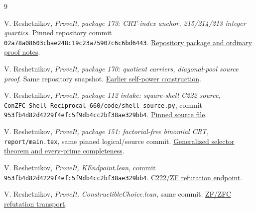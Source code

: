 \documentclass[11pt,a4paper]{article}
\theoremstyle{definition}
\newcommand{\file}[1]{\nolinkurl{#1}}
\begin{document}
\begin{thebibliography}{9}
\raggedright
{}
V. Reshetnikov, \emph{ProveIt, package 173: CRT-index anchor, 215/214/213
integer quartics}. Pinned repository commit
\texttt{02a78a08603cbae248c19c23a75907c6c6bd6443}.
\href{https://github.com/VladimirReshetnikov/ProveIt/tree/02a78a08603cbae248c19c23a75907c6c6bd6443/Computability/DiophantineConsistency/con-zfc-diophantine-forms/173-crt-index-anchor-215}{Repository package and ordinary proof notes}.

V. Reshetnikov, \emph{ProveIt, package 170: quotient carriers,
diagonal-pool source proof}. Same repository snapshot.
\href{https://github.com/VladimirReshetnikov/ProveIt/blob/02a78a08603cbae248c19c23a75907c6c6bd6443/Computability/DiophantineConsistency/con-zfc-diophantine-forms/170-quotient-carriers/direct/diagonal_pool/inputs/DIAGONAL_SOURCE_PROOF.md}{Earlier self-power construction}.

V. Reshetnikov, \emph{ProveIt, package 112 intake: square-shell C222 source},
\file{ConZFC_Shell_Reciprocal_660/code/shell_source.py}, commit
\texttt{953fb4d82d4229f4efc5f9db4cc2bf38ae329bb4}.
\href{https://github.com/VladimirReshetnikov/ProveIt/blob/953fb4d82d4229f4efc5f9db4cc2bf38ae329bb4/Computability/DiophantineConsistency/con-zfc-diophantine-forms/112-powered-saturation-round14/intake/ConZFC_Shell_Reciprocal_660_2026-10-24/ConZFC_Shell_Reciprocal_660/code/shell_source.py}{Pinned source file}.

V. Reshetnikov, \emph{ProveIt, package 151: factorial-free binomial CRT},
\file{report/main.tex}, same pinned logical/source commit.
\href{https://github.com/VladimirReshetnikov/ProveIt/blob/953fb4d82d4229f4efc5f9db4cc2bf38ae329bb4/Computability/DiophantineConsistency/con-zfc-diophantine-forms/151-factorial-free-binomial-crt/report/main.tex}{Generalized selector theorem and every-prime completeness}.

V. Reshetnikov, \emph{ProveIt, KEndpoint.lean}, commit
\texttt{953fb4d82d4229f4efc5f9db4cc2bf38ae329bb4}.
\href{https://github.com/VladimirReshetnikov/ProveIt/blob/953fb4d82d4229f4efc5f9db4cc2bf38ae329bb4/Computability/BusyBeaver/Lean/BusyBeaver/ZFC/KEndpoint.lean}{C222/ZF refutation endpoint}.

V. Reshetnikov, \emph{ProveIt, ConstructibleChoice.lean}, same commit.
\href{https://github.com/VladimirReshetnikov/ProveIt/blob/953fb4d82d4229f4efc5f9db4cc2bf38ae329bb4/Computability/BusyBeaver/Lean/BusyBeaver/ZFC/ConstructibleChoice.lean}{ZF/ZFC refutation transport}.
\end{thebibliography}
\end{document}
